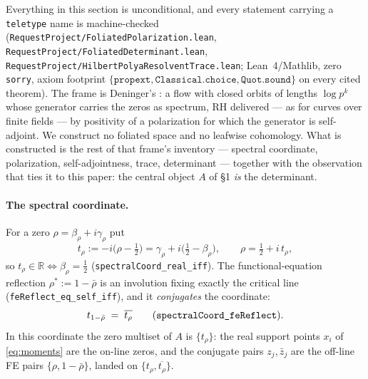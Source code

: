 \documentclass[11pt]{article}
\theoremstyle{plain}
\theoremstyle{definition}
\theoremstyle{remark}
\newcommand{\R}{\mathbb{R}}
\begin{document}
Everything in this section is unconditional, and every statement carrying a
\texttt{teletype} name is machine-checked
(\texttt{RequestProject/FoliatedPolarization.lean},
\texttt{RequestProject/FoliatedDeterminant.lean},
\texttt{RequestProject/HilbertPolyaResolventTrace.lean}; Lean~4/Mathlib, zero
\texttt{sorry}, axiom footprint
$\{\texttt{propext},\texttt{Classical.choice},\texttt{Quot.sound}\}$ on every
cited theorem). The frame is Deninger's \cite{Deninger1998}: a flow with
closed orbits of lengths $\log p^k$ whose generator carries the zeros as
spectrum, RH delivered --- as for curves over finite fields --- by positivity
of a polarization for which the generator is self-adjoint. We construct no
foliated space and no leafwise cohomology. What is constructed is the rest of
that frame's inventory --- spectral coordinate, polarization,
self-adjointness, trace, determinant --- together with the observation that
ties it to this paper: the central object $A$ of \S1 \emph{is} the
determinant.

\paragraph{The spectral coordinate.}
For a zero $\rho=\beta_\rho+i\gamma_\rho$ put
\[
  t_\rho := -i\bigl(\rho-\tfrac12\bigr)
          = \gamma_\rho + i\bigl(\tfrac12-\beta_\rho\bigr),
  \qquad \rho = \tfrac12 + i\,t_\rho ,
\]
so $t_\rho\in\R\iff\beta_\rho=\tfrac12$ (\texttt{spectralCoord\_real\_iff}).
The functional-equation reflection $\rho^*:=1-\bar\rho$ is an involution
fixing exactly the critical line (\texttt{feReflect\_eq\_self\_iff}), and it
\emph{conjugates} the coordinate:
\begin{equation}\label{eq:tconj}
  t_{1-\bar\rho} \;=\; \overline{t_\rho}
  \qquad\text{(\texttt{spectralCoord\_feReflect}).}
\end{equation}
In this coordinate the zero multiset of $A$ is $\{t_\rho\}$: the real support
points $x_i$ of \eqref{eq:moments} are the on-line zeros, and the conjugate
pairs $z_j,\bar z_j$ are the off-line FE pairs $\{\rho,1-\bar\rho\}$, landed
on $\{t_\rho,\overline{t_\rho}\}$.
\end{document}
